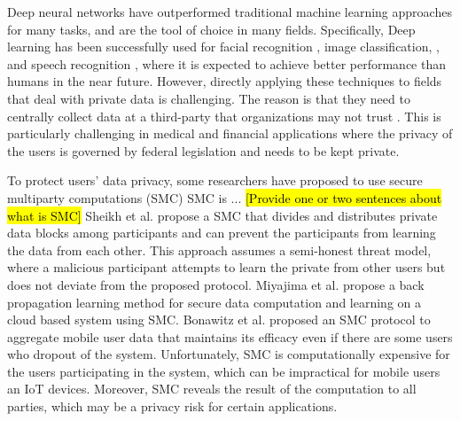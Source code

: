 \documentclass[conference]{IEEEtran}
\begin{document}
Deep neural networks have outperformed traditional machine learning approaches for many tasks, and are the tool of choice in many
fields. Specifically, Deep learning has been successfully used for facial recognition \cite{krizhevsky2012imagenet}, image classification, 
\cite{simard2003best}, and speech recognition \cite{hinton2012deep, graves2013speech }, where it is expected to achieve better
performance than humans in the near future. However, directly applying these techniques to fields that deal with private data is
challenging. The reason is that they need to centrally collect data at a third-party that organizations may not trust
\cite{chicurel2000databasing}. This is particularly challenging in medical and financial applications where the privacy of the users is
governed by federal legislation and needs to be kept private. 


To protect users' data privacy, some researchers have proposed to use secure multiparty computations (SMC) 
\cite{vaidya2003leveraging,7040943} SMC is ... \hl{[Provide one or two sentences about what is SMC]} 
Sheikh et al. \cite{sheikh2010distributed} propose a SMC that divides and distributes private data blocks among participants and can
prevent the participants from learning the data from  each other. This approach assumes a semi-honest threat model,
where a malicious  participant attempts to learn the private from other users but does not deviate from the proposed
protocol. 
Miyajima et al. \cite{miyajima2016new} propose a back propagation learning method for secure data computation and learning on a cloud
based system using SMC. %
Bonawitz et al. \cite{bonawitz2017practical}  proposed an SMC protocol to aggregate mobile user data that maintains its efficacy 
even if there are some users who dropout of the system. 
Unfortunately, SMC is computationally expensive for the users participating in the system, which can be impractical for mobile users
an IoT devices. Moreover, SMC reveals the result of the computation to all parties, which may be a privacy risk for certain
applications. 
\end{document}
